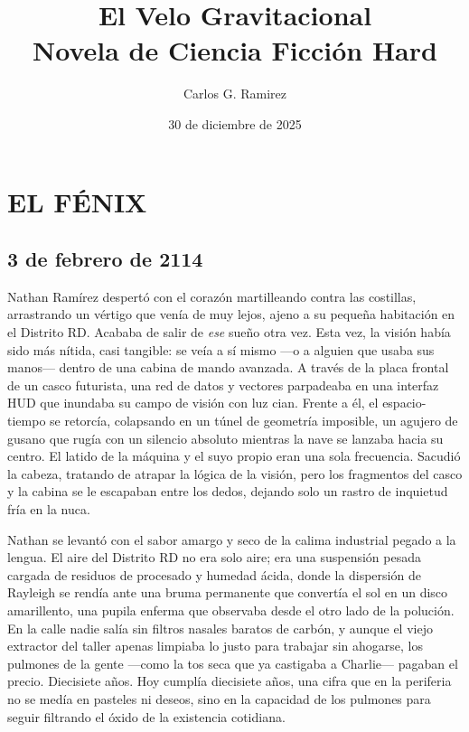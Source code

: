 \documentclass[12pt,a4paper]{book}
\title{\textbf{El Velo Gravitacional}\\[0.5cm]\large Novela de Ciencia Ficción Hard}
\author{Carlos G. Ramirez}
\date{30 de diciembre de 2025}
\begin{document}
\maketitle
\frontmatter
\tableofcontents
\newpage
\mainmatter

\chapter{EL FÉNIX}

\section*{3 de febrero de 2114}

Nathan Ramírez despertó con el corazón martilleando contra las costillas, arrastrando un vértigo que venía de muy lejos, ajeno a su pequeña habitación en el Distrito RD. Acababa de salir de \textit{ese} sueño otra vez. Esta vez, la visión había sido más nítida, casi tangible: se veía a sí mismo ---o a alguien que usaba sus manos--- dentro de una cabina de mando avanzada. A través de la placa frontal de un casco futurista, una red de datos y vectores parpadeaba en una interfaz HUD que inundaba su campo de visión con luz cian. Frente a él, el espacio-tiempo se retorcía, colapsando en un túnel de geometría imposible, un agujero de gusano que rugía con un silencio absoluto mientras la nave se lanzaba hacia su centro. El latido de la máquina y el suyo propio eran una sola frecuencia. Sacudió la cabeza, tratando de atrapar la lógica de la visión, pero los fragmentos del casco y la cabina se le escapaban entre los dedos, dejando solo un rastro de inquietud fría en la nuca.

Nathan se levantó con el sabor amargo y seco de la calima industrial pegado a la lengua. El aire del Distrito RD no era solo aire; era una suspensión pesada cargada de residuos de procesado y humedad ácida, donde la dispersión de Rayleigh se rendía ante una bruma permanente que convertía el sol en un disco amarillento, una pupila enferma que observaba desde el otro lado de la polución. En la calle nadie salía sin filtros nasales baratos de carbón, y aunque el viejo extractor del taller apenas limpiaba lo justo para trabajar sin ahogarse, los pulmones de la gente ---como la tos seca que ya castigaba a Charlie--- pagaban el precio. Diecisiete años. Hoy cumplía diecisiete años, una cifra que en la periferia no se medía en pasteles ni deseos, sino en la capacidad de los pulmones para seguir filtrando el óxido de la existencia cotidiana.
\end{document}
